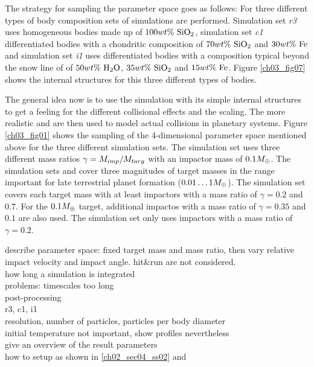 The strategy for sampling the parameter space goes as follows: For three different types of body composition sets of simulations are performed. Simulation set \emph{r3} uses homogeneous bodies made up of $100 wt\mathrm{\%}~\mathrm{SiO}_2$, simulation set \emph{c1} differentiated bodies with a chondritic composition of $70 wt\mathrm{\%}~\mathrm{SiO}_2$ and $30 wt\mathrm{\%}~\mathrm{Fe}$ and simulation set \emph{i1} uses differentiated bodies with a composition typical beyond the snow line of of $50 wt\mathrm{\%}~\mathrm{H}_2 \mathrm{O}$, $35 wt\mathrm{\%}~\mathrm{SiO}_2$ and $15 wt\mathrm{\%}~\mathrm{Fe}$. Figure \ref{ch03_fig07} shows the internal structures for this three different types of bodies.

The general idea now is to use the \rss simulation with its simple internal structures to get a feeling for the different collisional effects and the scaling. The more realistic \css and \iss are then used to model actual collisions in planetary systems. Figure \ref{ch03_fig01} shows the sampling of the 4-dimensional parameter space mentioned above for the three different simulation sets.  The \rss simulation set uses three different mass ratios $\gamma = M_{imp} / M_{targ}$ with an impactor mass of $0.1 M_{\oplus}$. The simulation sets \css and \iss cover three magnitudes of target masses in the range important for late terrestrial planet formation ($0.01 \dots 1 M_{\oplus}$). The \css simulation set covers each target mass with at least impactors with a mass ratio of $\gamma = 0.2$ and  $0.7$. For the $0.1 M_{\oplus}$ target, additional impactos with a mass ratio of $\gamma = 0.35$ and $0.1$ are also used. The \iss simulation set only uses impactors with a mass ratio of $\gamma = 0.2$.




describe parameter space: fixed target mass and mass ratio, then vary relative impact velocity and impact angle. hit\&run are not considered. \\
how long a simulation is integrated \\
problems: timescales too long\\
post-processing \\
r3, c1, i1 \\
resolution, number of particles, particles per body diameter \\
initial temperature not important, show profiles nevertheless \\
give an overview of the result parameters\\

how to setup
as shown in \ref{ch02_sec04_ss02} and \label{ch02_sec04_ss04}





